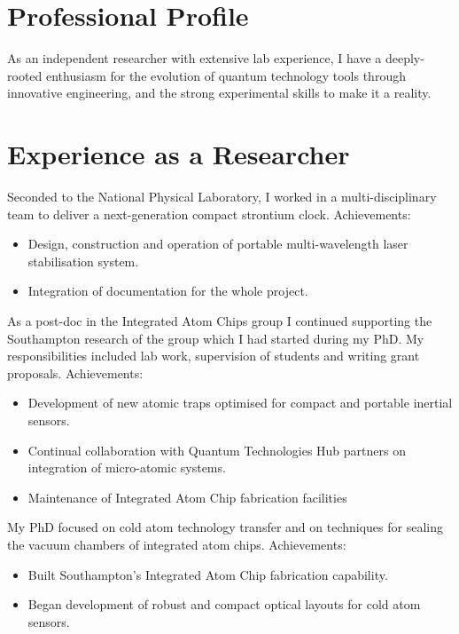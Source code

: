 \documentclass[11pt,a4paper,sans]{moderncv}        %
\begin{document}
\makecvtitle
\vspace{-1.5cm}
\section{Professional Profile}
As an independent researcher with extensive lab experience, I have a deeply-rooted enthusiasm for the evolution of quantum technology tools through innovative engineering, and the strong experimental skills to make it a reality.

\section{Experience as a Researcher}
{Seconded to the National Physical Laboratory, I worked in a multi-disciplinary team to deliver a next-generation compact strontium clock.
Achievements:
\begin{itemize}[leftmargin=1cm]
	\item Design, construction and operation of portable multi-wavelength laser stabilisation system.
	\item Integration of documentation for the whole project.
\end{itemize}
}  %

{As a post-doc in the Integrated Atom Chips group I continued supporting the Southampton research of the group which I had started during my PhD. My responsibilities included lab work, supervision of students and writing grant proposals.
Achievements:
\begin{itemize}[leftmargin=1cm]
	\item Development of new atomic traps optimised for compact and portable inertial sensors.
	\item Continual collaboration with Quantum Technologies Hub partners on integration of micro-atomic systems.
	\item Maintenance of Integrated Atom Chip fabrication facilities
\end{itemize}
} 

{My PhD focused on cold atom technology transfer and on techniques for sealing the vacuum chambers of integrated atom chips.
Achievements:
\begin{itemize}[leftmargin=1cm]
	\item Built Southampton's Integrated Atom Chip fabrication capability.
	\item Began development of robust and compact optical layouts for cold atom sensors.
\end{itemize}
}
\end{document}

